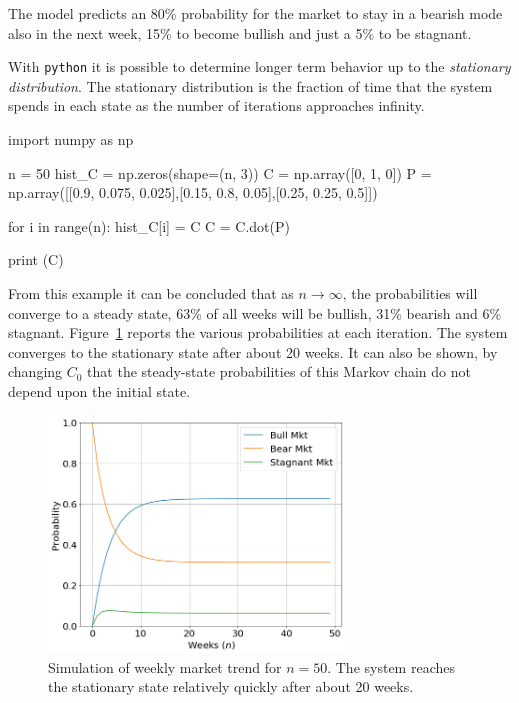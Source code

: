 The model predicts an 80\% probability for the market to stay in a bearish mode also in the next week, 15\% to become bullish and just a 5\% to be stagnant.

With \texttt{python} it is possible to determine longer term behavior up to the \emph{stationary distribution}. The stationary distribution is the fraction of time that the system spends in each state as the number of iterations approaches infinity.

\begin{ipython}
import numpy as np

n = 50
hist_C = np.zeros(shape=(n, 3))
C = np.array([0, 1, 0])
P = np.array([[0.9, 0.075, 0.025],[0.15, 0.8, 0.05],[0.25, 0.25, 0.5]])

for i in range(n):
    hist_C[i] = C
    C = C.dot(P)

print (C)
\end{ipython}
\begin{ioutput}
[0.62499979 0.31250019 0.06250002]
\end{ioutput}

From this example it can be concluded that as $n \rightarrow \infty$, the probabilities will converge to a steady state, 63\% of all weeks will be bullish, 31\% bearish and 6\% stagnant. Figure~\ref{fig:markov_chain_sim} reports the various probabilities at each iteration. The system converges to the stationary state after about 20 weeks.
It can also be shown, by changing $C_0$ that the steady-state probabilities of this Markov chain do not depend upon the initial state. 

\begin{figure}[!t]
	\centering
	\includegraphics[width=0.7\textwidth]{figures/markov_chain_sim}
	\caption{Simulation of weekly market trend for $n=50$. The system reaches the stationary state relatively quickly after about 20 weeks.}
	\label{fig:markov_chain_sim}
\end{figure}

